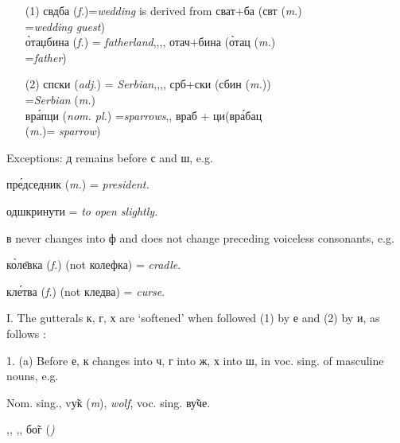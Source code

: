 \begin{itemize}
    \item[(1)] свдба (\emph{f.})=\emph{wedding} is derived
        from сват+ба (свт (\emph{m}.)\\
        \hspace*{3in}=\emph{wedding guest})\\
        \`{о}таџбина ({\it f.}) = \textit{fatherland}\quad ,,\qquad,, \quad
        отач+бина (\`{о}тац ({\it m.})\\
        \hspace*{3in}=\emph{father})  
    \item[(2)] спски ({\it adj.}) =
        \emph{Serbian}\qquad,,\qquad,, \quad 
        срб+ски (сбин ({\it m.}))\\
        \hspace*{3in}=\emph{Serbian} ({\it m.})\\
        вр\'{а}пци ({\it nom. pl.}) =\emph{sparrows}\qquad,, \quad
        враб + ци\quad(вр\'{а}бац\\
        \hspace*{3in}({\it m.})= \emph{sparrow})
\end{itemize}

Exceptions: д remains before с and ш, e.g.

\qquad\qquad пр\'{е}дседник ({\it m.}) = \emph{president.}

\qquad\qquad одшкринути = \emph{to open slightly.}

в never changes into ф and does not change preceding voiceless consonants, e.g.

\qquad\qquad к\`{о}л\={е}вка ({\it f.}) (not колефка) = \textit{cradle}.

\qquad\qquad кл\'{е}тва ({\it f.}) (not кледва) = \textit{curse}.


I. The gutterals к, г, х are `softened' when followed (1) by е and (2) by и, as follows :
\newpage

1. (a) Before е, к changes into ч, г into ж, х into ш, in voc. sing. of masculine nouns, e.g.

Nom. sing., v\~{у}к ({\it m}), \emph{wolf}, voc. sing. в\~{у}че.

\quad,, \qquad ,, \qquad б\~{о}г (\it ) 
